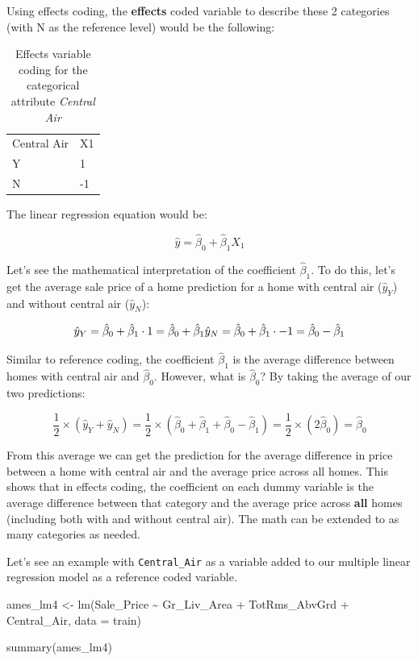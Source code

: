 \documentclass[
  letterpaper,
  DIV=11,
  numbers=noendperiod]{scrreprt}
\newenvironment{Shaded}{\begin{snugshade}}{\end{snugshade}}
\newcommand{\AttributeTok}[1]{\textcolor[rgb]{0.40,0.45,0.13}{#1}}
\newcommand{\FunctionTok}[1]{\textcolor[rgb]{0.28,0.35,0.67}{#1}}
\newcommand{\NormalTok}[1]{\textcolor[rgb]{0.00,0.23,0.31}{#1}}
\newcommand{\OtherTok}[1]{\textcolor[rgb]{0.00,0.23,0.31}{#1}}
\newcommand{\SpecialCharTok}[1]{\textcolor[rgb]{0.37,0.37,0.37}{#1}}
\begin{document}
Using effects coding, the \textbf{effects} coded variable to describe
these 2 categories (with N as the reference level) would be the
following:

\hypertarget{tbl-centralaireff}{}
\begin{longtable}[]{@{}ll@{}}
\caption{\label{tbl-centralaireff}Effects variable coding for the
categorical attribute \emph{Central Air}}\tabularnewline
\toprule()
\endhead
Central Air & X1 \\
Y & 1 \\
N & -1 \\
\bottomrule()
\end{longtable}

The linear regression equation would be:

\[
\hat{y} = \hat{\beta}_0 + \hat{\beta}_1 X_1
\]

Let's see the mathematical interpretation of the coefficient
\(\hat{\beta}_1\). To do this, let's get the average sale price of a
home prediction for a home with central air (\(\hat{y}_Y\)) and without
central air (\(\hat{y}_N\)):

\[
\hat{y}_Y = \hat{\beta}_0 + \hat{\beta}_1 \cdot 1 = \hat{\beta}_0 + \hat{\beta}_1 \\
\hat{y}_N = \hat{\beta}_0 + \hat{\beta}_1 \cdot -1 = \hat{\beta}_0 - \hat{\beta}_1
\]

Similar to reference coding, the coefficient \(\hat{\beta}_1\) is the
average difference between homes with central air and \(\hat{\beta}_0\).
However, what is \(\hat{\beta}_0\)? By taking the average of our two
predictions:

\[
\frac{1}{2} \times (\hat{y}_Y + \hat{y}_N) = \frac{1}{2} \times (\hat{\beta}_0 + \hat{\beta}_1 + \hat{\beta}_0 - \hat{\beta}_1) = \frac{1}{2} \times (2\hat{\beta}_0) = \hat{\beta}_0
\]

From this average we can get the prediction for the average difference
in price between a home with central air and the average price across
all homes. This shows that in effects coding, the coefficient on each
dummy variable is the average difference between that category and the
average price across \textbf{all} homes (including both with and without
central air). The math can be extended to as many categories as needed.

Let's see an example with \texttt{Central\_Air} as a variable added to
our multiple linear regression model as a reference coded variable.

\begin{Shaded}
\begin{Highlighting}[]
\NormalTok{ames\_lm4 }\OtherTok{\textless{}{-}} \FunctionTok{lm}\NormalTok{(Sale\_Price }\SpecialCharTok{\textasciitilde{}}\NormalTok{ Gr\_Liv\_Area }\SpecialCharTok{+}\NormalTok{ TotRms\_AbvGrd }\SpecialCharTok{+}\NormalTok{ Central\_Air, }\AttributeTok{data =}\NormalTok{ train)}

\FunctionTok{summary}\NormalTok{(ames\_lm4)}
\end{Highlighting}
\end{Shaded}
\end{document}
